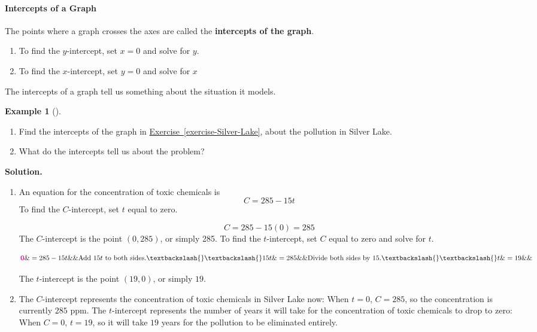 \documentclass[10pt,]{book}
\newcommand{\terminology}[1]{\textbf{#1}}
\theoremstyle{plain}
\theoremstyle{definition}
\theoremstyle{definition}
\theoremstyle{definition}
\newtheorem{example}[theorem]{Example}
\theoremstyle{definition}
\theoremstyle{definition}
\numberwithin{equation}{section}
\newcommand{\alert}[1]{\mathbf{\color{magenta}{#1}}}
\begin{document}
\paragraph[Intercepts of a Graph]{Intercepts of a Graph}\label{paragraphs-3}
The points where a graph crosses the axes are called the \terminology{intercepts of the graph}.%
\leavevmode%
\begin{enumerate}
\item\hypertarget{li-52}{}To find the \(y\)-intercept, set \(x=0\) and solve for \(y\).%
\item\hypertarget{li-53}{}To find the \(x\)-intercept, set \(y=0\) and solve for \(x\)%
\end{enumerate}
\par

      The intercepts of a graph tell us something about the situation it models.  
\begin{example}[]\label{example-intercepts}
\leavevmode%
\begin{enumerate}[label=*\alph**]
\item\hypertarget{li-54}{}
        Find the intercepts of the graph in \hyperref[exercise-Silver-Lake]{Exercise~\ref{exercise-Silver-Lake}}, about the pollution in Silver Lake.
    \item\hypertarget{li-55}{}What do the intercepts tell us about the problem?
    \end{enumerate}
\par\medskip\noindent%
\textbf{Solution.}\quad \leavevmode%
\begin{enumerate}[label=*\alph**]
\item\hypertarget{li-56}{}An equation for the concentration of toxic chemicals is \begin{equation*}C=285-15t\end{equation*} To find the \(C\)-intercept, set \(t\) equal to zero. 

            \begin{equation*}C=285-15(0)=285\end{equation*}
            The \(C\)-intercept is the point \((0, 285)\), or simply 285.  To find the \(t\)-intercept, set \(C\) equal to zero and solve for \(t\).
            
                \begin{align*}
                \alert{0}\&=285-15t \&\&\text{Add }15t \text{ to both sides.}\textbackslash{}\textbackslash{}
                15t\&=285  \&\&\text{Divide both sides by 15.}\textbackslash{}\textbackslash{}
                t\&=19   \&\& 
                \end{align*}


        The \(t\)-intercept is the point \((19,0)\), or simply \(19\).%
\item\hypertarget{li-57}{}The \(C\)-intercept represents the concentration of toxic chemicals in Silver Lake now:  When  \(t=0\), \(C=285\),  so the concentration is currently \(285\) ppm.  The \(t\)-intercept represents the number of years it will take for the concentration of toxic chemicals to drop to zero:  When \(C=0\), \(t=19\),  so it will take \(19\) years for the pollution to be eliminated entirely.%
\end{enumerate}
\end{example}
\end{document}
